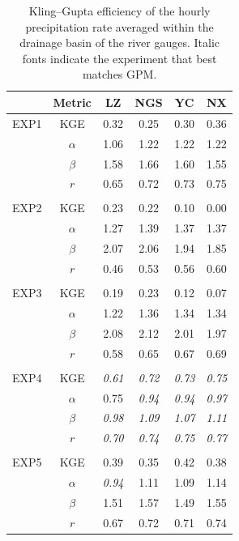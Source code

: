 \documentclass[draft]{agujournal2019}
\begin{document}
\begin{table}[h!]
  \centering
  \doublerulesep 0.3pt
  \renewcommand{\arraystretch}{1}  %
  \caption{Kling--Gupta efficiency of the hourly precipitation rate averaged within the drainage basin of the river gauges. Italic fonts indicate the experiment that best matches GPM.}
  \label{tab:pr_skill}
  \vspace*{5mm}
  \small
  \begin{tabular*}{80mm}{cccccc}
    \hline
    & Metric & LZ & NGS & YC & NX \\
    \hline
    EXP1 & KGE & 0.32 & 0.25 & 0.30 & 0.36 \\
    & $\alpha$ & 1.06 & 1.22 & 1.22 & 1.22 \\
    & $\beta$ & 1.58 & 1.66 & 1.60 & 1.55 \\
    & $r$ & 0.65 & 0.72 & 0.73 & 0.75 \\
    \\
    EXP2 & KGE & \textminus{}0.23 & \textminus{}0.22 & \textminus{}0.10 & 0.00 \\
    & $\alpha$ & 1.27 & 1.39 & 1.37 & 1.37 \\
    & $\beta$ & 2.07 & 2.06 & 1.94 & 1.85 \\
    & $r$ & 0.46 & 0.53 & 0.56 & 0.60 \\
    \\
    EXP3 & KGE & \textminus{}0.19 & \textminus{}0.23 & \textminus{}0.12 & \textminus{}0.07 \\
    & $\alpha$ & 1.22 & 1.36 & 1.34 & 1.34 \\
    & $\beta$ & 2.08 & 2.12 & 2.01 & 1.97 \\
    & $r$ & 0.58 & 0.65 & 0.67 & 0.69 \\
    \\
    EXP4 & KGE & \textit{0.61} & \textit{0.72} & \textit{0.73} & \textit{0.75} \\
    & $\alpha$ & 0.75 & \textit{0.94} & \textit{0.94} & \textit{0.97} \\
    & $\beta$ & \textit{0.98} & \textit{1.09} & \textit{1.07} & \textit{1.11} \\
    & $r$ & \textit{0.70} & \textit{0.74} & \textit{0.75} & \textit{0.77} \\
    \\
    EXP5 & KGE & 0.39 & 0.35 & 0.42 & 0.38 \\
    & $\alpha$ & \textit{0.94} & 1.11 & 1.09 & 1.14 \\
    & $\beta$ & 1.51 & 1.57 & 1.49 & 1.55 \\
    & $r$ & 0.67 & 0.72 & 0.71 & 0.74 \\
    \hline
  \end{tabular*}
  \renewcommand{\arraystretch}{1}  %
\end{table}
\end{document}

